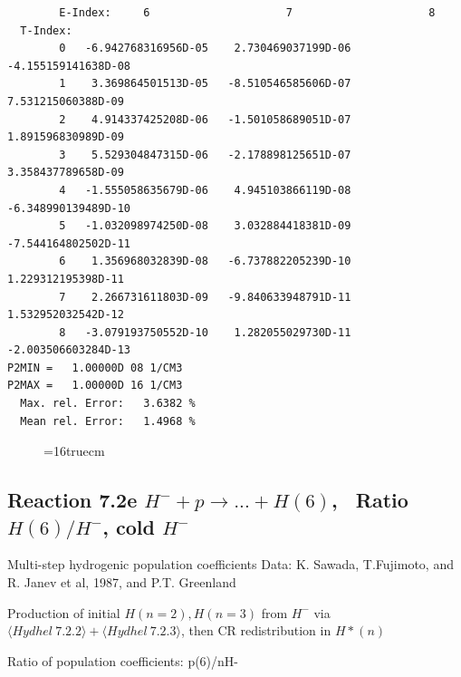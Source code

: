 \documentclass[12pt,dvipdfmx]{article}
\begin{document}
\begin{small}
\begin{verbatim}
        E-Index:     6                     7                     8
  T-Index:
        0   -6.942768316956D-05    2.730469037199D-06   -4.155159141638D-08
        1    3.369864501513D-05   -8.510546585606D-07    7.531215060388D-09
        2    4.914337425208D-06   -1.501058689051D-07    1.891596830989D-09
        3    5.529304847315D-06   -2.178898125651D-07    3.358437789658D-09
        4   -1.555058635679D-06    4.945103866119D-08   -6.348990139489D-10
        5   -1.032098974250D-08    3.032884418381D-09   -7.544164802502D-11
        6    1.356968032839D-08   -6.737882205239D-10    1.229312195398D-11
        7    2.266731611803D-09   -9.840633948791D-11    1.532952032542D-12
        8   -3.079193750552D-10    1.282055029730D-11   -2.003506603284D-13
P2MIN =   1.00000D 08 1/CM3
P2MAX =   1.00000D 16 1/CM3
  Max. rel. Error:   3.6382 %
  Mean rel. Error:   1.4968 %

\end{verbatim}\end{small}
\begin{figure} \label{7.2d}
\epsfxsize=16truecm
\end{figure}
\newpage

\subsection{
Reaction 7.2e $ H^- + p \rightarrow ...+ H(6) $, \   Ratio $H(6)/H^- $, cold $H^-$
}
 Multi-step hydrogenic population coefficients
 Data: K. Sawada, T.Fujimoto, \cite{kn:Sawada} and R. Janev et al, 1987, and P.T. Greenland

Production of initial $H(n=2), H(n=3)$ from $H^-$ via $ \langle Hydhel~ 7.2.2\rangle + \langle Hydhel~ 7.2.3\rangle$,
 then CR redistribution in $H*(n)$

 Ratio of population coefficients: p(6)/nH-
\end{document}
